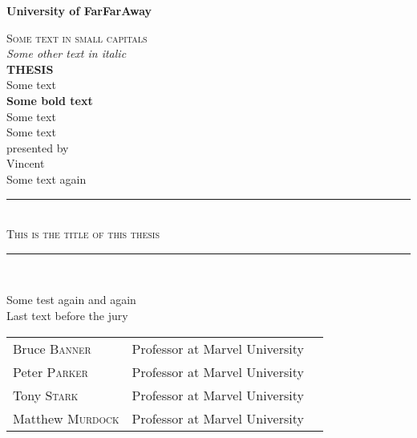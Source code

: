 \thispagestyle{empty}

\thispagestyle{empty}
\enlargethispage{3cm}
\vspace*{-2cm}
\hspace*{-2.9cm}
\begin{minipage}[t]{17cm}
	\centering

\LARGE{\textbf{University of FarFarAway}}\\
\vspace{1cm}

\textsc{Some text in small capitals}\\
\vspace*{0.3cm}
\large{\textit{Some other text in italic}}\\

\vspace*{0.9cm}
\huge{\textbf{THESIS}}\\

\vspace*{1.2cm}
\normalsize{Some text}\\
\vspace*{0.3cm}
\Large{\textbf{Some bold text}}\\
\vspace*{0.3cm}
\normalsize{Some text}\\
\vspace*{0.3cm}
\normalsize{Some text}\\

\vspace*{0.9cm}
\normalsize{presented by}\\
\vspace*{0.3cm}
\Large{Vincent }\\

\vspace*{0.5cm}
\normalsize{Some text again}\\

\vspace*{1.5cm}
\rule{\textwidth}{3pt}\\
\vspace*{0.8cm}
{\LARGE\textsc{This is the title of this thesis}}\\
\vspace*{0.5cm}
\rule{\textwidth}{3pt}\\

\normalsize

\vspace*{1.5cm}
Some test again and again\\

\vspace*{0.7cm}
Last text before the jury

\vspace*{0.7cm}
\begin{tabular}{lll}
Bruce \textsc{Banner}    & Professor at Marvel University    \\
Peter \textsc{Parker}    & Professor at Marvel University    \\
Tony \textsc{Stark}      & Professor at Marvel University    \\
Matthew \textsc{Murdock} & Professor at Marvel University    \\
\end{tabular}

\end{minipage}